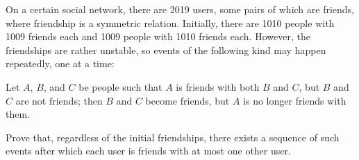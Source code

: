 On a certain social network, there are 2019 users, some pairs of which are friends, where friendship is a symmetric relation. Initially, there are 1010 people with 1009 friends each and 1009 people with 1010 friends each. However, the friendships are rather unstable, so events of the following kind may happen repeatedly, one at a time:

Let $A$, $B$, and $C$ be people such that $A$ is friends with both $B$ and $C$, but $B$ and $C$ are not friends; then $B$ and $C$ become friends, but $A$ is no longer friends with them.

Prove that, regardless of the initial friendships, there exists a sequence of such events after which each user is friends with at most one other user.
